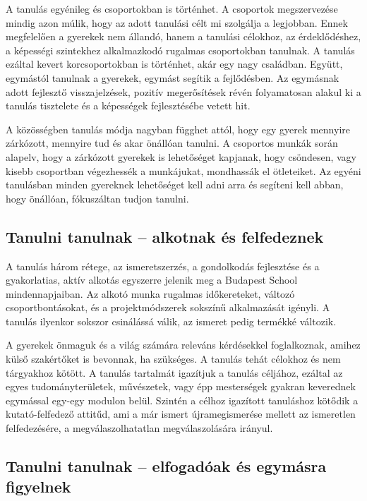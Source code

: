 A tanulás egyénileg és csoportokban is történhet. A csoportok megszervezése mindig azon múlik, hogy az adott tanulási célt mi szolgálja a legjobban. Ennek megfelelően a gyerekek nem állandó, hanem a tanulási célokhoz, az érdeklődéshez, a képességi szintekhez alkalmazkodó rugalmas csoportokban tanulnak. A tanulás ezáltal kevert korcsoportokban is történhet, akár egy nagy családban. Együtt, egymástól tanulnak a gyerekek, egymást segítik a fejlődésben. Az egymásnak adott fejlesztő visszajelzések, pozitív megerősítések révén folyamatosan alakul ki a tanulás tisztelete és a képességek fejlesztésébe vetett hit.

A közösségben tanulás módja nagyban függhet attól, hogy egy gyerek mennyire zárkózott, mennyire tud és akar önállóan tanulni. A csoportos munkák során alapelv, hogy a zárkózott gyerekek is lehetőséget kapjanak, hogy csöndesen, vagy kisebb csoportban végezhessék a munkájukat, mondhassák el ötleteiket. Az egyéni tanulásban minden gyereknek lehetőséget kell adni arra és segíteni kell abban, hogy önállóan, fókuszáltan tudjon tanulni.\vfill\eject

\subsection{Tanulni tanulnak -- alkotnak és felfedeznek}
A tanulás három rétege, az ismeretszerzés, a gondolkodás fejlesztése és a gyakorlatias, aktív alkotás egyszerre jelenik meg a Budapest School mindennapjaiban. Az alkotó munka rugalmas időkereteket, változó csoportbontásokat, és a projektmódszerek sokszínű alkalmazását igényli. A tanulás ilyenkor sokszor csinálássá válik, az ismeret pedig termékké változik.

A gyerekek önmaguk és a világ számára releváns kérdésekkel foglalkoznak, amihez külső szakértőket is bevonnak, ha szükséges. A tanulás tehát célokhoz és nem tárgyakhoz kötött. A tanulás tartalmát igazítjuk a tanulás céljához, ezáltal az egyes tudományterületek, művészetek, vagy épp mesterségek gyakran keverednek egymással egy-egy modulon belül. Szintén a célhoz igazított tanuláshoz kötődik a kutató-felfedező attitűd, ami a már ismert újramegismerése mellett az ismeretlen felfedezésére, a megválaszolhatatlan megválaszolására irányul.

\subsection{Tanulni tanulnak -- elfogadóak és egymásra figyelnek}


